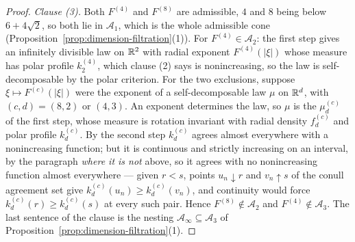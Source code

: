 \begin{proof}
\emph{Clause (3).} Both $F^{(4)}$ and $F^{(8)}$ are admissible, $4$ and $8$ being below
$6+4\sqrt2$, so both lie in $\mathcal{A}_1$, which is the whole admissible cone
(Proposition~\ref{prop:dimension-filtration}(1)). For $F^{(4)} \in \mathcal{A}_2$: the first step
gives an infinitely divisible law on $\mathbb{R}^2$ with radial exponent $F^{(4)}(|\xi|)$ whose \Levy{}
measure has polar profile $k^{(4)}_2$, which clause (2) says is nonincreasing, so the law is
self-decomposable by the polar criterion. For the two exclusions, suppose
$\xi \mapsto F^{(c)}(|\xi|)$ were the exponent of a self-decomposable law $\mu$ on $\mathbb{R}^d$, with
$(c,d) = (8,2)$ or $(4,3)$. An exponent determines the law, so $\mu$ is the $\mu^{(c)}_d$ of the
first step, whose \Levy{} measure is rotation invariant with radial density $f^{(c)}_d$ and polar
profile $k^{(c)}_d$. By the second step $k^{(c)}_d$ agrees almost everywhere with a nonincreasing
function; but it is continuous and strictly increasing on an interval, by the paragraph
\emph{where it is not} above, so it agrees with no nonincreasing function almost everywhere ---
given $r < s$, points $u_n \downarrow r$ and $v_n \uparrow s$ of the conull agreement set give
$k^{(c)}_d(u_n) \ge k^{(c)}_d(v_n)$, and continuity would force $k^{(c)}_d(r) \ge k^{(c)}_d(s)$ at
every such pair. Hence $F^{(8)} \notin \mathcal{A}_2$ and $F^{(4)} \notin \mathcal{A}_3$. The last
sentence of the clause is the nesting $\mathcal{A}_\infty \subseteq \mathcal{A}_3$ of
Proposition~\ref{prop:dimension-filtration}(1).
\end{proof}
